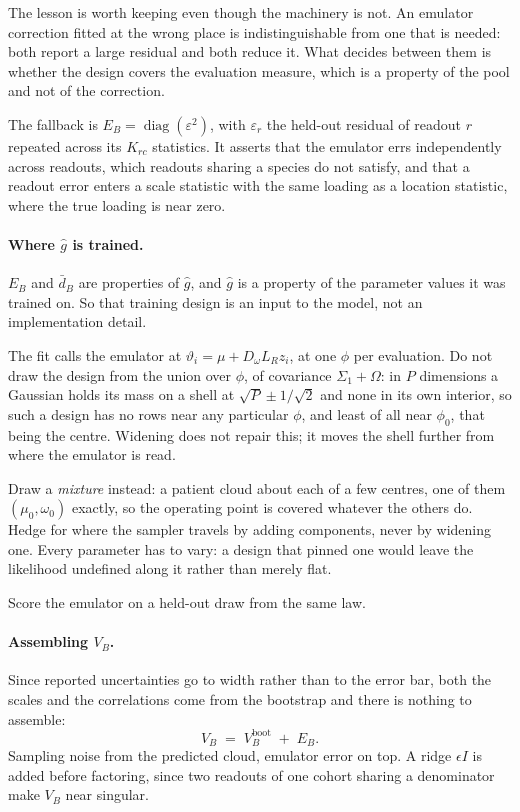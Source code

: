 \documentclass[11pt]{article}
\DeclareMathOperator{\diag}{diag}
\begin{document}
The lesson is worth keeping even though the machinery is not. An emulator
correction fitted at the wrong place is indistinguishable from one that is
needed: both report a large residual and both reduce it. What decides between
them is whether the design covers the evaluation measure, which is a property of
the pool and not of the correction.

The fallback is $E_B=\diag(\varepsilon^2)$, with $\varepsilon_r$ the held-out
residual of readout $r$ repeated across its $K_{rc}$ statistics. It asserts that
the emulator errs independently across readouts, which readouts sharing a species
do not satisfy, and that a readout error enters a scale statistic with the same
loading as a location statistic, where the true loading is near zero.

\paragraph{Where $\widehat g$ is trained.} $E_B$ and $\bar d_B$ are properties of
$\widehat g$, and $\widehat g$ is a property of the parameter values it was
trained on. So that training design is an input to the model, not an
implementation detail.

The fit calls the emulator at $\vartheta_i = \mu + D_\omega L_R z_i$, at one
$\phi$ per evaluation. Do not draw the design from the union over $\phi$, of
covariance $\Sigma_1 + \Omega$: in $P$ dimensions a Gaussian holds its mass on a
shell at $\sqrt{P} \pm 1/\sqrt{2}$ and none in its own interior, so such a design
has no rows near any particular $\phi$, and least of all near $\phi_0$, that
being the centre. Widening does not repair this; it moves the shell further from
where the emulator is read.

Draw a \emph{mixture} instead: a patient cloud about each of a few centres, one
of them $(\mu_0, \omega_0)$ exactly, so the operating point is covered whatever
the others do. Hedge for where the sampler travels by adding
components, never by widening one. Every parameter has to vary: a design that
pinned one would leave the likelihood undefined along it rather than merely flat.

Score the emulator on a held-out draw from the same law.

\paragraph{Assembling $V_B$.} Since reported uncertainties go to width rather
than to the error bar, both the scales and the correlations come from the
bootstrap and there is nothing to assemble:
\begin{equation}
V_B \;=\; V^{\text{boot}}_B \;+\; E_B .
\label{eq:Vsplit}
\end{equation}
Sampling noise from the predicted cloud, emulator error on top. A ridge
$\epsilon I$ is added before factoring, since two readouts of one cohort sharing
a denominator make $V_B$ near singular.
\end{document}
